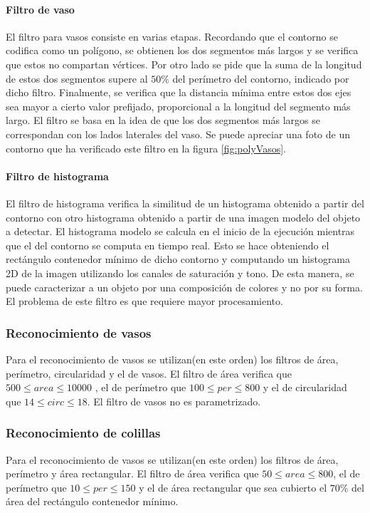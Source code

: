 	\paragraph{Filtro de vaso}
	El filtro para vasos consiste en varias etapas. Recordando que el contorno se codifica como un polígono, se obtienen los dos segmentos 
	más largos y se verifica que estos no compartan vértices. Por otro lado se pide que la suma de la longitud de estos dos segmentos supere al $50\%$ del 
	perímetro del contorno, indicado por dicho filtro. Finalmente, se verifica que la distancia mínima entre estos dos ejes sea mayor a cierto valor prefijado, proporcional a la
	longitud del segmento más largo. El filtro se basa en la idea de que 
	los dos segmentos más largos se correspondan con los lados laterales 
	del vaso.  Se puede apreciar una foto  de un contorno que ha 
	verificado este filtro en la figura \ref{fig:polyVasos}. 
	\paragraph{Filtro de histograma}
	El filtro de histograma verifica la similitud de un histograma obtenido a partir del contorno con otro histograma obtenido a partir de 
	una imagen modelo del objeto a detectar. El histograma modelo se calcula en el inicio de la ejecución mientras que el del contorno se
	computa en tiempo real. Esto se hace obteniendo el rectángulo 
	contenedor mínimo de dicho contorno y computando un histograma 2D de la imagen
	utilizando los canales de saturación y tono. De esta manera, se 
	puede caracterizar a un objeto por una composición de colores y no por su forma. El 
	problema de este filtro es que requiere mayor procesamiento.
	
	\subsubsection{Reconocimiento de vasos}
	Para el reconocimiento de vasos se utilizan(en este orden) los filtros de área, perímetro, circularidad y el de vasos.
	El filtro de área verifica que $500 \leq area \leq 10000 $ , el de 
	perímetro que $100 \leq per \leq 800 $ y el de circularidad
	que $14 \leq circ \leq 18$. El filtro de vasos no es parametrizado. 
	
	\subsubsection{Reconocimiento de colillas}
	Para el reconocimiento de vasos se utilizan(en este orden) los filtros de área, perímetro y área rectangular.
	El filtro de área verifica que $50 \leq area \leq 800 $, el de perímetro que $10 \leq per \leq 150 $ y el de área rectangular
	que sea cubierto el $70\%$ del área del rectángulo contenedor mínimo.
	
